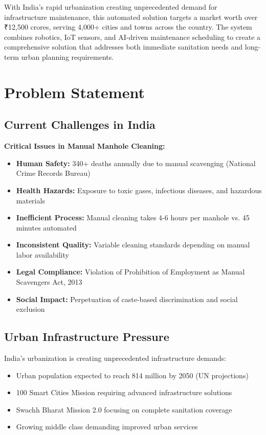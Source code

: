 \documentclass[11pt,a4paper]{article}
\begin{document}
With India's rapid urbanization creating unprecedented demand for infrastructure maintenance, this automated solution targets a market worth over ₹12,500 crores, serving 4,000+ cities and towns across the country. The system combines robotics, IoT sensors, and AI-driven maintenance scheduling to create a comprehensive solution that addresses both immediate sanitation needs and long-term urban planning requirements.

\section{Problem Statement}

\subsection{Current Challenges in India}

\begin{warning}
\textbf{Critical Issues in Manual Manhole Cleaning:}
\begin{itemize}
    \item \textbf{Human Safety:} 340+ deaths annually due to manual scavenging (National Crime Records Bureau)
    \item \textbf{Health Hazards:} Exposure to toxic gases, infectious diseases, and hazardous materials
    \item \textbf{Inefficient Process:} Manual cleaning takes 4-6 hours per manhole vs. 45 minutes automated
    \item \textbf{Inconsistent Quality:} Variable cleaning standards depending on manual labor availability
    \item \textbf{Legal Compliance:} Violation of Prohibition of Employment as Manual Scavengers Act, 2013
    \item \textbf{Social Impact:} Perpetuation of caste-based discrimination and social exclusion
\end{itemize}
\end{warning}

\subsection{Urban Infrastructure Pressure}
India's urbanization is creating unprecedented infrastructure demands:
\begin{itemize}[leftmargin=2em]
    \item Urban population expected to reach 814 million by 2050 (UN projections)
    \item 100 Smart Cities Mission requiring advanced infrastructure solutions
    \item Swachh Bharat Mission 2.0 focusing on complete sanitation coverage
    \item Growing middle class demanding improved urban services
\end{itemize}
\end{document}
